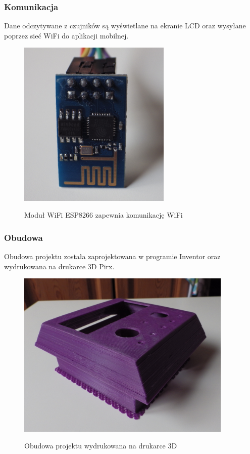 \documentclass[12pt,a4paper]{article}
\begin{document}
\newpage

\subsubsection{Komunikacja}
Dane odczytywane z czujników są wyświetlane na ekranie LCD oraz wysyłane poprzez sieć WiFi do aplikacji mobilnej.
\begin{figure}[!h]	
\centering
	\includegraphics[height =80mm]{ESP8266.jpg}
	\label{ESP8266}
	\caption{Moduł WiFi ESP8266 zapewnia komunikację WiFi}
\end{figure}	

\subsubsection{Obudowa}
Obudowa projektu została zaprojektowana w programie Inventor oraz wydrukowana na drukarce 3D Pirx.
	\begin{figure}[!h]
	\centering
		\includegraphics[height =80mm]{obudowa.jpg}
		\label{elktro}
		\caption{Obudowa projektu wydrukowana na drukarce 3D}
	\end{figure}
\end{document}
